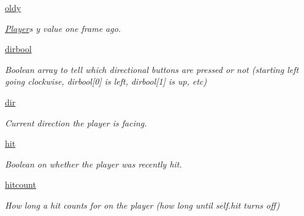 \begin{DoxyCompactItemize}
\mbox{\label{classactor_1_1player_1_1_player_a732ab21f88b48cad06541e86e4f5166c}} 
\hyperlink{classactor_1_1player_1_1_player_a732ab21f88b48cad06541e86e4f5166c}{oldy}
\begin{DoxyCompactList}\small\item\em \hyperlink{classactor_1_1player_1_1_player}{Player}\textquotesingle{}s y value one frame ago. \end{DoxyCompactList}\item 
\mbox{\label{classactor_1_1player_1_1_player_aae66aa3ba8ee37f20c3f24278c203f5b}} 
\hyperlink{classactor_1_1player_1_1_player_aae66aa3ba8ee37f20c3f24278c203f5b}{dirbool}
\begin{DoxyCompactList}\small\item\em Boolean array to tell which directional buttons are pressed or not (starting left going clockwise, dirbool\mbox{[}0\mbox{]} is left, dirbool\mbox{[}1\mbox{]} is up, etc) \end{DoxyCompactList}\item 
\hyperlink{classactor_1_1player_1_1_player_a569ec214c309ddbf82e414c310861832}{dir}
\begin{DoxyCompactList}\small\item\em Current direction the player is facing. \end{DoxyCompactList}\item 
\mbox{\label{classactor_1_1player_1_1_player_a80a7403771d9fb980354b43241eb21d2}} 
\hyperlink{classactor_1_1player_1_1_player_a80a7403771d9fb980354b43241eb21d2}{hit}
\begin{DoxyCompactList}\small\item\em Boolean on whether the player was recently hit. \end{DoxyCompactList}\item 
\mbox{\label{classactor_1_1player_1_1_player_a0c6434fb932d898b1ec1ed77c97d46b5}} 
\hyperlink{classactor_1_1player_1_1_player_a0c6434fb932d898b1ec1ed77c97d46b5}{hitcount}
\begin{DoxyCompactList}\small\item\em How long a hit counts for on the player (how long until self.\+hit turns off) \end{DoxyCompactList}\item 

\end{DoxyCompactItemize}
